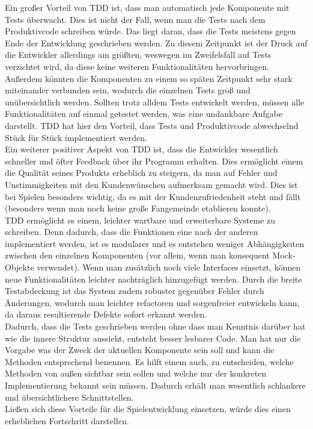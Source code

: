 Ein großer Vorteil von TDD ist, dass man automatisch jede Komponente mit Tests überwacht. Dies ist nicht der Fall, wenn man die Tests nach dem Produktivcode schreiben würde. Das liegt daran, dass die Tests meistens gegen Ende der Entwicklung geschrieben werden. Zu diesem Zeitpunkt ist der Druck auf die Entwickler allerdings am größten, weswegen im Zweifelsfall auf Tests verzichtet wird, da diese keine weiteren Funktionalitäten hervorbringen. Außerdem könnten die Komponenten zu einem so späten Zeitpunkt sehr stark miteinander verbunden sein, wodurch die einzelnen Tests groß und unübersichtlich werden. Sollten trotz alldem Tests entwickelt werden, müssen alle Funktionalitäten auf einmal getestet werden, was eine undankbare Aufgabe darstellt. TDD hat hier den Vorteil, dass Tests und Produktivcode abwechselnd Stück für Stück implementiert werden.\\
Ein weiterer positiver Aspekt von TDD ist, dass die Entwickler wesentlich schneller und öfter Feedback über ihr Programm erhalten. Dies ermöglicht einem die Qualität seines Produkts erheblich zu steigern, da man auf Fehler und Unstimmigkeiten mit den Kundenwünschen aufmerksam gemacht wird. Dies ist bei Spielen besonders wichtig, da es mit der Kundenzufriedenheit steht und fällt (besonders wenn man noch keine große Fangemeinde etablieren konnte).\\
TDD ermöglicht es einem, leichter wartbare und erweiterbare Systeme zu schreiben. Denn dadurch, dass die Funktionen eine nach der anderen implementiert werden, ist es modularer und es entstehen weniger Abhängigkeiten zwischen den einzelnen Komponenten (vor allem, wenn man konsequent Mock-Objekte verwendet). Wenn man zusätzlich noch viele Interfaces einsetzt, können neue Funktionalitäten leichter nachträglich hinzugefügt werden. Durch die breite Testabdeckung ist das System zudem robuster gegenüber Fehler durch Änderungen, wodurch man leichter refactoren und sorgenfreier entwickeln kann, da daraus resultierende Defekte sofort erkannt werden.\\
Dadurch, dass die Tests geschrieben werden ohne dass man Kenntnis darüber hat wie die innere Struktur aussieht, entsteht besser lesbarer Code. Man hat nur die Vorgabe was der Zweck der aktuellen Komponente sein soll und kann die Methoden entsprechend benennen. Es hilft einem auch, zu entscheiden, welche Methoden von außen sichtbar sein sollen und welche nur der konkreten Implementierung bekannt sein müssen. Dadurch erhält man wesentlich schlankere und übersichtlichere Schnittstellen.\\
Ließen sich diese Vorteile für die Spielentwicklung einsetzen, würde dies einen erheblichen Fortschritt darstellen.

